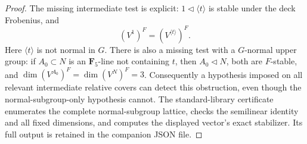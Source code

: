\documentclass[11pt]{article}
\begin{document}
\begin{proof}
The missing intermediate test is explicit:
$1\triangleleft\langle t\rangle$ is stable under the
deck Frobenius, and
\[
            (V^1)^F=(V^{\langle t\rangle})^F.
\]
Here $\langle t\rangle$ is not normal in $G$.
There is also a missing test with a $G$-normal upper group:
if $A_0\subset N$ is an $\mathbf F_5$-line not containing $t$,
then $A_0\triangleleft N$, both are $F$-stable, and
$\dim(V^{A_0})^F=\dim(V^N)^F=3$.
Consequently a hypothesis imposed on all relevant
intermediate relative covers can detect this obstruction,
even though the normal-subgroup-only hypothesis cannot.
The standard-library certificate
enumerates the complete normal-subgroup lattice,
checks the semilinear identity and all fixed dimensions,
and computes the displayed vector's exact stabilizer.
Its full output is retained in the companion JSON file.
\end{proof}
\end{document}
